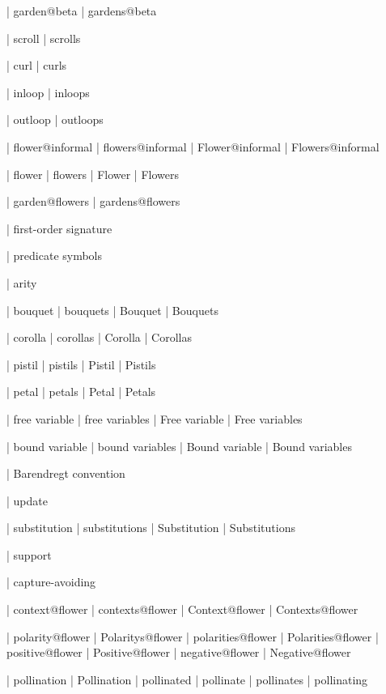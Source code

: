  | garden@beta
 | gardens@beta


 | scroll
 | scrolls

 | curl
 | curls

 | inloop
 | inloops

 | outloop
 | outloops

 | flower@informal
 | flowers@informal
 | Flower@informal
 | Flowers@informal

 | flower
 | flowers
 | Flower
 | Flowers

 | garden@flowers
 | gardens@flowers

 | first-order signature

 | predicate symbols

 | arity

 | bouquet
 | bouquets
 | Bouquet
 | Bouquets

 | corolla
 | corollas
 | Corolla
 | Corollas

 | pistil
 | pistils
 | Pistil
 | Pistils

 | petal
 | petals
 | Petal
 | Petals

 | free variable
 | free variables
 | Free variable
 | Free variables

 | bound variable
 | bound variables
 | Bound variable
 | Bound variables

 | Barendregt convention

 | update

 | substitution
 | substitutions
 | Substitution
 | Substitutions

 | support

 | capture-avoiding

 | context@flower
 | contexts@flower
 | Context@flower
 | Contexts@flower

 | polarity@flower
 | Polaritys@flower
 | polarities@flower
 | Polarities@flower
 | positive@flower
 | Positive@flower
 | negative@flower
 | Negative@flower

 | pollination
 | Pollination
 | pollinated
 | pollinate
 | pollinates
 | pollinating

